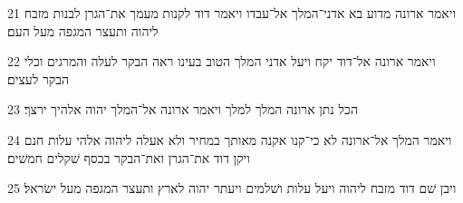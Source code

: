 \par 21 ויאמר ארונה מדוע בא אדני־המלך אל־עבדו ויאמר דוד לקנות מעמך את־הגרן לבנות מזבח ליהוה ותעצר המגפה מעל העם׃
\par 22 ויאמר ארונה אל־דוד יקח ויעל אדני המלך הטוב בעינו ראה הבקר לעלה והמרגים וכלי הבקר לעצים׃
\par 23 הכל נתן ארונה המלך למלך ויאמר ארונה אל־המלך יהוה אלהיך ירצך׃
\par 24 ויאמר המלך אל־ארונה לא כי־קנו אקנה מאותך במחיר ולא אעלה ליהוה אלהי עלות חנם ויקן דוד את־הגרן ואת־הבקר בכסף שׁקלים חמשׁים׃
\par 25 ויבן שׁם דוד מזבח ליהוה ויעל עלות ושׁלמים ויעתר יהוה לארץ ותעצר המגפה מעל ישׂראל׃



